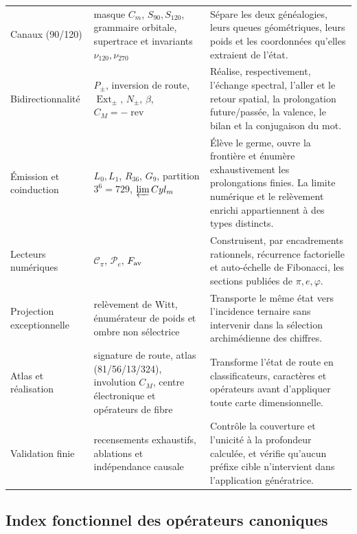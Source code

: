 \begin{longtable}{@{}p{}p{}p{}@{}}
Canaux (90/120) &
masque \(C_m\), \(S_{90},S_{120}\), grammaire orbitale,
supertrace et invariants \(\nu_{120},\nu_{270}\) &
Sépare les deux généalogies, leurs queues géométriques, leurs poids et les
coordonnées qu'elles extraient de l'état. \\

Bidirectionnalité &
\(P_\pm\), inversion de route, \(\operatorname{Ext}_\pm\),
\(N_\pm\), \(\beta\), \(C_M=-\operatorname{rev}\) &
Réalise, respectivement, l'échange spectral, l'aller et le retour spatial,
la prolongation future/passée, la valence, le bilan et la conjugaison du mot. \\

Émission et coinduction &
\(L_0,L_1\), \(R_{36}\), \(G_9\), partition \(3^6=729\),
\(\varprojlim\operatorname{Cyl}_m\) &
Élève le germe, ouvre la frontière et énumère exhaustivement les
prolongations finies. La limite numérique et le relèvement enrichi
appartiennent à des types distincts. \\

Lecteurs numériques &
\(\mathscr C_\pi\), \(\mathscr P_e\), \(F_{\rm av}\) &
Construisent, par encadrements rationnels, récurrence factorielle et auto-échelle de
Fibonacci, les sections publiées de \(\pi,e,\varphi\). \\

Projection exceptionnelle &
relèvement de Witt, énumérateur de poids et ombre non sélectrice &
Transporte le même état vers l'incidence ternaire sans intervenir dans la
sélection archimédienne des chiffres. \\

Atlas et réalisation &
signature de route, atlas (81/56/13/324), involution \(C_M\), centre
électronique et opérateurs de fibre &
Transforme l'état de route en classificateurs, caractères et opérateurs avant
d'appliquer toute carte dimensionnelle. \\

Validation finie &
recensements exhaustifs, ablations et indépendance causale &
Contrôle la couverture et l'unicité à la profondeur calculée, et vérifie
qu'aucun préfixe cible n'intervient dans l'application génératrice. \\
\bottomrule
\end{longtable}
\endgroup

\subsection{Index fonctionnel des opérateurs canoniques}

